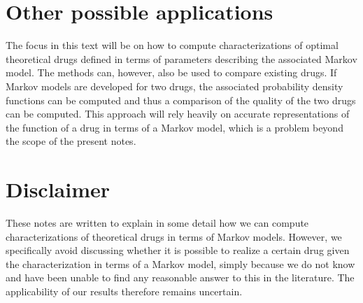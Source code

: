 
\section{Other possible applications}

The focus in this text will be on how to compute characterizations of optimal theoretical drugs defined in terms of parameters describing the associated Markov model. The methods can, however, also be used to compare existing drugs. If Markov models are developed for two drugs, the associated probability density functions can be computed and thus a comparison of the quality of the two drugs can be computed. This approach will rely heavily on accurate representations of the function of a drug in terms of a Markov model, which is a problem beyond the scope of the present notes.


\section{Disclaimer}
These notes are written to explain in some detail how we can compute characterizations of theoretical drugs in terms of Markov models. However, we specifically avoid discussing whether it is possible to realize a certain drug given the characterization in terms of a Markov model, simply because we do not know and have been unable to find any reasonable answer to this in the literature.  The applicability of our results therefore remains uncertain.


